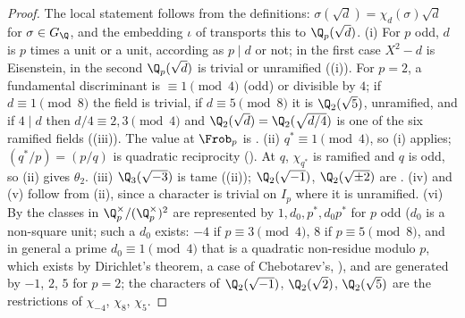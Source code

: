 \begin{proof}
The local statement follows from the definitions: $\sigma(\sqrt d)=\chi_d(\sigma)\sqrt d$ for $\sigma\in G_\Q$, and the embedding $\iota$ of 
transports this to $\Q_p(\sqrt d)$. (i) For $p$ odd, $d$ is $p$ times a unit or a unit, according as $p\mid d$ or not; in the first case $X^2-d$ is
Eisenstein, in the second $\Q_p(\sqrt d)$ is trivial or unramified ((i)). For $p=2$, a fundamental discriminant is $\equiv1\pmod4$
(odd) or divisible by $4$; if $d\equiv1\pmod8$ the field is trivial, if $d\equiv5\pmod8$ it is $\Q_2(\sqrt5)$, unramified, and if $4\mid d$ then
$d/4\equiv2,3\pmod4$ and $\Q_2(\sqrt d)=\Q_2(\sqrt{d/4})$ is one of the six ramified fields ((iii)). The value at $\Frob_p$ is
. (ii) $q^*\equiv1\pmod4$, so (i) applies; $(q^*/p)=(p/q)$ is quadratic reciprocity (). At $q$, $\chi_{q^*}$ is ramified and $q$ is odd,
so (ii) gives $\theta_2$. (iii) $\Q_3(\sqrt{-3})$ is tame ((ii)); $\Q_2(\sqrt{-1})$, $\Q_2(\sqrt{\pm2})$ are
. (iv) and (v) follow from (ii), since a character is trivial on $I_p$ where it is unramified. (vi) By 
the classes in $\Q_p^\times/(\Q_p^\times)^2$ are represented by $1,d_0,p^*,d_0p^*$ for $p$ odd ($d_0$ is a non-square unit; such a $d_0$ exists: $-4$ if
$p\equiv3\pmod4$, $8$ if $p\equiv5\pmod8$, and in general a prime $d_0\equiv1\pmod4$ that is a quadratic non-residue modulo $p$, which exists by Dirichlet's
theorem, a case of Chebotarev's, ), and are generated by $-1$, $2$, $5$ for $p=2$;
the characters of $\Q_2(\sqrt{-1})$, $\Q_2(\sqrt2)$, $\Q_2(\sqrt5)$ are the restrictions of $\chi_{-4}$, $\chi_8$, $\chi_5$.
\end{proof}

